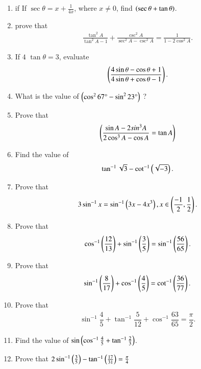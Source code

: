 \begin{enumerate}[label=\thesubsection.\arabic*,ref=\thesubsection.\theenumi,itemsep=1pt]
  
  \hfill{}\item if If $\sec\theta = x + \frac{1}{4x}$, where $x \neq 0$, find $\left(\sec\theta + \tan\theta\right)$.
  \hfill{}\item prove that \begin{align*} \frac{\tan^2A}{\tan^2 A-1}+\frac{\csc^2 A}{\sec^2 A-\csc^2 A}=\frac{1}{1-2\cos^2 A}.\end{align*}
\hfill{}
\item If $4$ $\tan\theta=3$, evaluate \begin{align*}\left(\frac{4 \sin\theta - \cos\theta + 1 }{ 4 \sin\theta + \cos\theta - 1 } \right) .\end{align*}  
\hfill{}
\item What is the value of $ \left(\cos^2 67\degree - \sin^2 23\degree\right)$ ?
\hfill{}\item  Prove that $$\left(\frac{\sin A - 2sin^3 A}{2 \cos^3 A-\cos A} = \tan A \right)$$
			\hfill{}
\item Find the value of
	\begin{align*}
		\tan^{-1}\sqrt{3}-\cot^{-1}\left(\sqrt{-3}\right)
	.\end{align*}
 \hfill{}\item Prove that 
			\begin{align*}
		3\sin^{-1}x=\sin^{-1}\left(3x-4x^3\right), x\in\left(\frac{-1}{2},\frac{1}{2}\right)
			.\end{align*}
\hfill{}\item Prove that 
	\begin{align*}
		\cos^{-1}\left(\frac{12}{13}\right)+\sin^{-1}\left(\frac{3}{5}\right)=\sin^{-1} \left(\frac{56}{65}\right)
	.\end{align*}
 \hfill{}\item Prove that 
         \begin{align*}
          \sin^{-1}\left(\dfrac{8}{17}\right)+\cos^{-1}\left(\dfrac{4}{5}\right)=\cot^{-1}\left(\dfrac{36}{77}\right)
         .\end{align*}
\hfill{}\item Prove that 
    \begin{align*}
       \sin^{-1}\dfrac{4}{5}+\tan^{-1}\dfrac{5}{12}+\cos^{-1}\dfrac{63}{65}=\dfrac{\pi}{2}
    .\end{align*}
\hfill{}
\item Find the value of $\sin\left(\cos^{-1}{\frac{4}{5}}+{\tan^{-1}{\frac{2}{3}}}\right)$.
\hfill{}
\item Prove that $ 2\sin^{-1} \left(\frac{3}{5}\right) - \tan^{-1} \left(\frac{17}{31}\right) = \frac{\pi}{4}$

\end{enumerate}
